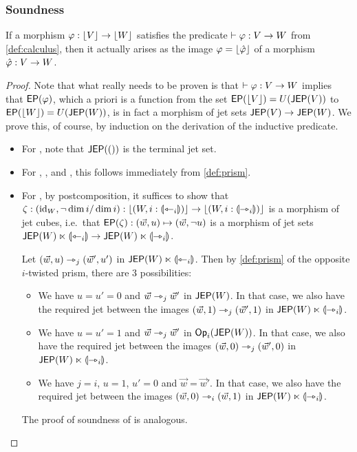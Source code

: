 \documentclass[a4paper]{article}
\begin{document}
\subsubsection{Soundness}
\begin{theorem}[Soundness] \label{thm:calculus-sound}
	If a morphism $\varphi : \mathopen{}\left\lfloor V \right\rfloor\mathclose{} \to \mathopen{}\left\lfloor W \right\rfloor\mathclose{}$ satisfies the predicate $\vdash \varphi : V \to W$ from \cref{def:calculus}, then it actually arises as the image $\varphi = \mathopen{}\left\lfloor \hat {\varphi} \right\rfloor\mathclose{}$ of a morphism $\hat {\varphi} : V \to W$.
\end{theorem}
\begin{proof}
	Note that what really needs to be proven is that $\vdash \varphi : V \to W$ implies that $\mathsf{EP}(\varphi)$, which a priori is a function from the set $\mathsf{EP}(\mathopen{}\left\lfloor V \right\rfloor\mathclose{}) = U(\mathsf{JEP}(V))$ to $\mathsf{EP}(\mathopen{}\left\lfloor W \right\rfloor\mathclose{}) = U(\mathsf{JEP}(W))$, is in fact a morphism of jet sets $\mathsf{JEP}(V) \to \mathsf{JEP}(W)$.
	We prove this, of course, by induction on the derivation of the inductive predicate.
	
	\begin{itemize}
		\item For , note that $\mathsf{JEP}(())$ is the terminal jet set.
	
		\item For , ,  and , this follows immediately from \cref{def:prism}.
		
		\item For , by postcomposition, it suffices to show that $\zeta : (\mathrm{id}_W, \lnot \dim i / \dim i) : \mathopen{}\left\lfloor (W, i : {\llparenthesis \leftarrowtriangle_i \rrparenthesis}) \right\rfloor\mathclose{} \to \mathopen{}\left\lfloor (W, i : {\llparenthesis \rightarrowtriangle_i \rrparenthesis}) \right\rfloor\mathclose{}$ is a morphism of jet cubes, i.e.\ that $\mathsf{EP}(\zeta) : (\vec w, u) \mapsto (\vec w, \lnot u)$ is a morphism of jet sets $\mathsf{JEP}(W) \ltimes {\llparenthesis \leftarrowtriangle_i \rrparenthesis} \to \mathsf{JEP}(W) \ltimes {\llparenthesis \rightarrowtriangle_i \rrparenthesis}$.
		
		Let $(\vec w, u) \rightarrowtriangle_j (\vec w', u')$ in $\mathsf{JEP}(W) \ltimes {\llparenthesis \leftarrowtriangle_i \rrparenthesis}$. Then by \cref{def:prism} of the opposite $i$-twisted prism, there are 3 possibilities:
		\begin{itemize}
			\item We have $u = u' = 0$ and $\vec w \rightarrowtriangle_j \vec w'$ in $\mathsf{JEP}(W)$.
			In that case, we also have the required jet between the images $(\vec w, 1) \rightarrowtriangle_j (\vec w', 1)$ in $\mathsf{JEP}(W) \ltimes {\llparenthesis \rightarrowtriangle_i \rrparenthesis}$.
			\item We have $u = u' = 1$ and $\vec w \rightarrowtriangle_j \vec w'$ in ${\mathsf{Op}}_i(\mathsf{JEP}(W))$.
			In that case, we also have the required jet between the images $(\vec w, 0) \rightarrowtriangle_j (\vec w', 0)$ in $\mathsf{JEP}(W) \ltimes {\llparenthesis \rightarrowtriangle_i \rrparenthesis}$.
			\item We have $j = i$, $u = 1$, $u' = 0$ and $\vec w = \vec w'$.
			In that case, we also have the required jet between the images $(\vec w, 0) \rightarrowtriangle_i (\vec w, 1)$ in $\mathsf{JEP}(W) \ltimes {\llparenthesis \rightarrowtriangle_i \rrparenthesis}$.
		\end{itemize}
		The proof of soundness of  is analogous.
		

\end{itemize}
\end{proof}
\end{document}
